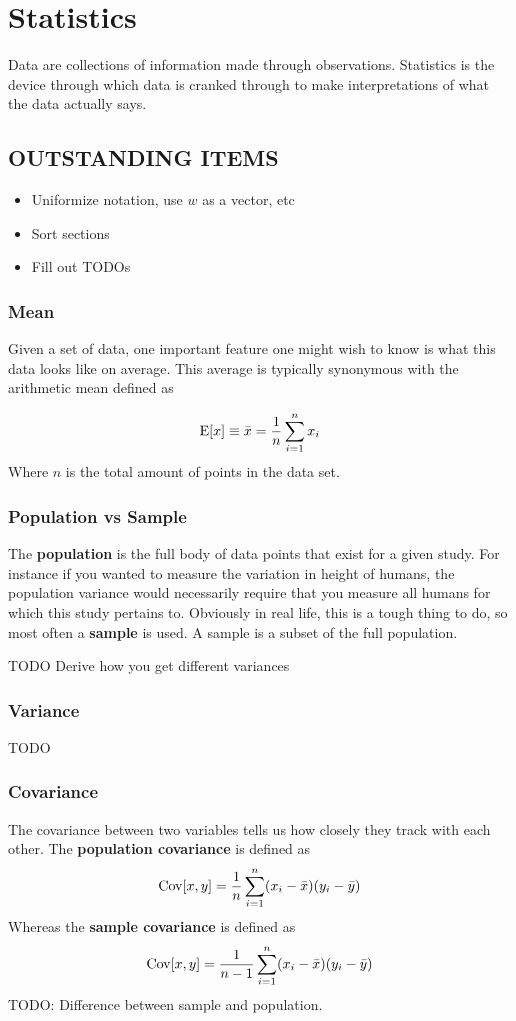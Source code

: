 \chapter{Statistics}
Data are collections of information made through observations. Statistics is the device through which data is cranked through to make interpretations of what the data actually says.

\section{OUTSTANDING ITEMS}
\begin{itemize}
	\item Uniformize notation, use $w$ as a vector, etc
	\item Sort sections
	\item Fill out TODOs
\end{itemize}

\subsection{Mean}
Given a set of data, one important feature one might wish to know is what this data looks like on average. This average is typically synonymous with the arithmetic mean defined as 

\begin{align}
\mathrm{E}[x] \equiv \bar{x} = \frac{1}{n}\sum_{i=1}^n x_i
\end{align}
Where $n$ is the total amount of points in the data set.
\subsection{Population vs Sample}
The \textbf{population} is the full body of data points that exist for a given study. For instance if you wanted to measure the variation in height of humans, the population variance would necessarily require that you measure all humans for which this study pertains to. Obviously in real life, this is a tough thing to do, so most often a \textbf{sample} is used. A sample is a subset of the full population.

TODO Derive how you get different variances

\subsection{Variance}
TODO
\subsection{Covariance}
The covariance between two variables tells us how closely they track with each other. The \textbf{population covariance} is defined as 
\begin{align}
\mathrm{Cov}[x,y] = \frac{1}{n}\sum_{i=1}^n (x_i-\bar{x})(y_i-\bar{y})
\end{align}
Whereas the \textbf{sample covariance} is defined as 
\begin{align}
	\mathrm{Cov}[x,y] = \frac{1}{n-1}\sum_{i=1}^n (x_i-\bar{x})(y_i-\bar{y})
\end{align}
TODO: Difference between sample and population.

